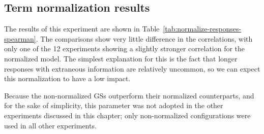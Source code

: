 %

\subsection{Term normalization results}
\label{sec:term-norm-results}

The results of this experiment are shown in Table~\ref{tab:normalize-responses-spearman}. The comparisons show very little difference in the correlations, with only one of the 12 experiments showing a slightly stronger correlation for the normalized model. The simplest explanation for this is the fact that longer responses with extraneous information are relatively uncommon, so we can expect this normalization to have a low impact.

Because the non-normalized GSs outperform their normalized counterparts, and for the sake of simplicity, this parameter was not adopted in the other experiments discussed in this chapter; only non-normalized configurations were used in all other experiments.


